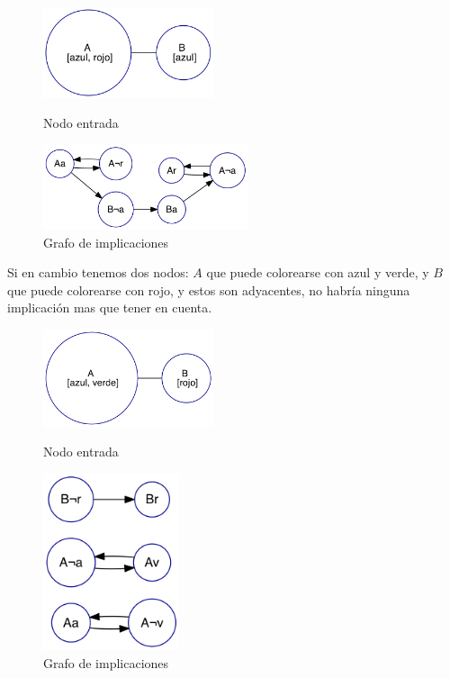 \documentclass{article}
\theoremstyle{definition}
\theoremstyle{remark}
\begin{document}
\begin{figure}
\centering
\begin{minipage}{0.45\textwidth}
\centering
\includegraphics[width=5cm]{graphs/ej1/ej1_intro_2na.png}
\caption{Nodo entrada\label{grf:ex1-example-2na}}
\end{minipage}\hfill
\begin{minipage}{0.45\textwidth}
\centering
\includegraphics[width=6cm]{graphs/ej1/ej1_intro_2na_impl.png}
\caption{Grafo de implicaciones\label{grf:ex1-example-2na_impl}}
\end{minipage}
\end{figure}

Si en cambio tenemos dos nodos: $A$ que puede colorearse con azul y verde, y $B$ que puede colorearse con rojo, y estos son adyacentes, no habría ninguna implicación mas que tener en cuenta.

\begin{figure}
\centering
\begin{minipage}{0.45\textwidth}
\centering
\includegraphics[width=5cm]{graphs/ej1/ej1_intro_2n.png}
\caption{Nodo entrada\label{grf:ex1-example-2n}}
\end{minipage}\hfill
\begin{minipage}{0.45\textwidth}
\centering
\includegraphics[width=4cm]{graphs/ej1/ej1_intro_2n_impl.png}
\caption{Grafo de implicaciones\label{grf:ex1-example-2n_impl}}
\end{minipage}
\end{figure}
\end{document}

